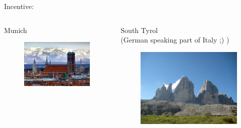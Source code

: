 \documentclass[compress]{beamer}
\begin{document}
\begin{frame}{Incentive:}
\begin{columns}
\begin{column}{.5\textwidth}
Munich
\begin{figure}[t]
    \centering
    \includegraphics[width=.9\textwidth]{images/munich.jpg}
\end{figure}
\end{column}
\begin{column}{.5\textwidth}
South Tyrol\\
\tiny{(German speaking part of Italy ;) )}
\begin{figure}[t]
    \centering
    \includegraphics[width=.9\textwidth]{images/drei_zinnen.jpg}
\end{figure}
\end{column}
\end{columns}
\end{frame}
\end{document}
